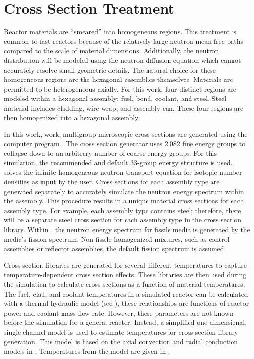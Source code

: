 \section{Cross Section Treatment}
  \label{sec:cross_section_treatment}
  Reactor materials are ``smeared'' into homogeneous regions. This treatment is
  common to fast reactors because of the relatively large neutron
  mean-free-paths compared to the scale of material dimensions. Additionally,
  the neutron distribution will be modeled using the neutron diffusion equation
  which cannot accurately resolve small geometric details. The natural
  choice for these homogeneous regions are the hexagonal assemblies themselves.
  Materials are permitted to be heterogeneous axially. For this work, four
  distinct regions are modeled within a hexagonal assembly: fuel, bond, coolant,
  and steel. Steel material includes cladding, wire wrap, and assembly can. 
  These four regions are then homogenized into a hexagonal assembly.

  In this work, work, multigroup microscopic cross sections are generated using
  the computer program \mcc \cite{mcc}. The cross section generator uses 2,082
  fine energy groups to collapse down to an arbitrary number of coarse energy
  groups. For this simulation, the recommended and default 33-group energy
  structure is used. \mcc solves the infinite-homogeneous neutron transport
  equation for isotopic number densities as input by the user. Cross sections
  for each assembly type are generated separately to accurately simulate the
  neutron energy spectrum within the assembly. This procedure results in a
  unique material cross sections for each assembly type. For example, each
  assembly type contains steel; therefore, there will be a separate steel cross
  section for each assembly type in the cross section library. Within \mcc, the 
  neutron energy spectrum for fissile media is generated by the media's fission 
  spectrum. Non-fissile homogenized mixtures, such as control assemblies or 
  reflector assemblies, the default  fission spectrum is assumed.

  Cross section libraries are generated for several different temperatures to
  capture temperature-dependent cross section effects. These libraries are then
  used during the simulation to calculate cross sections as a function of
  material temperatures. The fuel, clad, and coolant temperatures in a
  simulated reactor can be calculated with a thermal hydraulic model (see
  ), these relationships are functions of reactor
  power and coolant mass flow rate. However, these parameters are not known
  before the simulation for a general reactor. Instead, a simplified
  one-dimensional, single-channel model is used to estimate temperatures for
  cross section library generation. This model is based on the axial convection
  and radial conduction models in . Temperatures
  from the model are given in .

